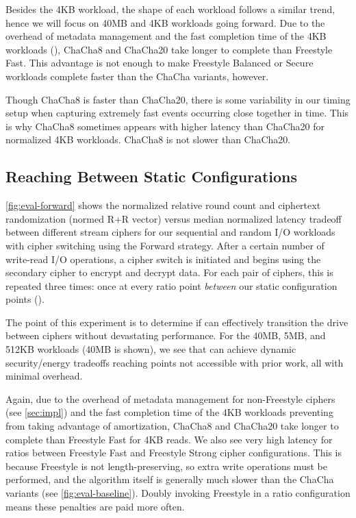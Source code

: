 Besides the 4KB workload, the shape of each workload follows a similar trend,
hence we will focus on 40MB and 4KB workloads going forward. Due to the overhead
of metadata management and the fast completion time of the 4KB workloads
(), ChaCha8 and ChaCha20 take
longer to complete than Freestyle Fast. This advantage is not enough to make
Freestyle Balanced or Secure workloads complete faster than the ChaCha variants,
however.

Though ChaCha8 is faster than ChaCha20, there is some variability in our timing
setup when capturing extremely fast events occurring close together in time.
This is why ChaCha8 sometimes appears with higher latency than ChaCha20 for
normalized 4KB workloads. ChaCha8 is not slower than ChaCha20.


\subsection{Reaching Between Static Configurations}\label{subsec:eval-dynamic}



\cref{fig:eval-forward} shows the normalized relative round count and ciphertext
randomization (normed R+R vector) versus median normalized latency tradeoff
between different stream ciphers for our sequential and random I/O workloads
with cipher switching using the Forward strategy. After a certain number of
write-read I/O operations, a cipher switch is initiated and \sys begins using
the secondary cipher to encrypt and decrypt data. For each pair of ciphers, this
is repeated three times: once at every ratio point \emph{between} our static
configuration points ().

The point of this experiment is to determine if \sys can effectively transition
the drive between ciphers without devastating performance. For the 40MB, 5MB,
and 512KB workloads (40MB is shown), we see that \sys can achieve dynamic
security/energy tradeoffs reaching points not accessible with prior work, all
with minimal overhead.

Again, due to the overhead of metadata management for non-Freestyle ciphers (see
\cref{sec:impl}) and the fast completion time of the 4KB workloads preventing
\sys from taking advantage of amortization, ChaCha8 and ChaCha20 take longer to
complete than Freestyle Fast for 4KB reads. We also see very high latency for
ratios between Freestyle Fast and Freestyle Strong cipher configurations. This
is because Freestyle is not length-preserving, so extra write operations must be
performed, and the algorithm itself is generally much slower than the ChaCha
variants (see \cref{fig:eval-baseline}). Doubly invoking Freestyle in a ratio
configuration means these penalties are paid more often.

